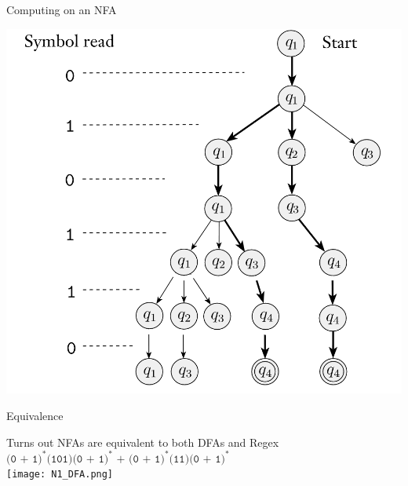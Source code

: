 \documentclass[aspectratio=169]{beamer}
\begin{document}
\begin{frame}{Computing on an NFA}
    \begin{center}
        \includegraphics[scale=0.80]{N1_compute/N1_7.png}
    \end{center}
\end{frame}

\begin{frame}{Equivalence}
    \begin{center}
        Turns out NFAs are equivalent to both DFAs and Regex \pause \\[10pt]
        {\Large $\texttt{(0 + 1)}^*\texttt{(101)}\texttt{(0 + 1)}^*\texttt{ + }\texttt{(0 + 1)}^*\texttt{(11)}\texttt{(0 + 1)}^*$}\pause \\[10pt]
        \texttt{[image: N1\_DFA.png]}
    \end{center}
\end{frame}
\end{document}
